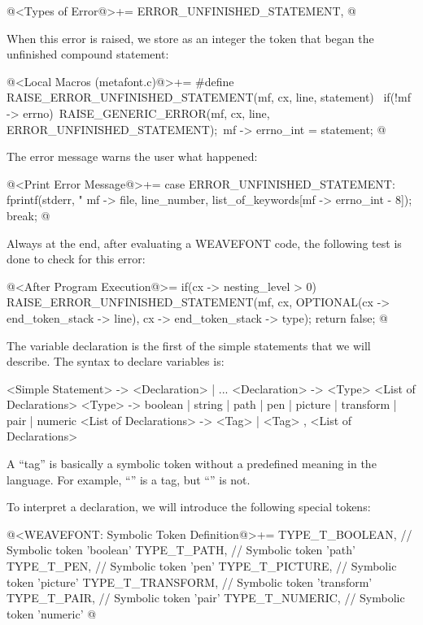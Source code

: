 \iniciocodigo
@<Types of Error@>+=
ERROR_UNFINISHED_STATEMENT,
@
\fimcodigo

When this error is raised, we store as an integer the token that began
the unfinished compound statement:

\iniciocodigo
@<Local Macros (metafont.c)@>+=
#define RAISE_ERROR_UNFINISHED_STATEMENT(mf, cx, line, statement) {\
  if(!mf -> errno){\
    RAISE_GENERIC_ERROR(mf, cx, line, ERROR_UNFINISHED_STATEMENT);\
    mf -> errno_int = statement;}}
@
\fimcodigo

The error message warns the user what happened:

\iniciocodigo
@<Print Error Message@>+=
case ERROR_UNFINISHED_STATEMENT:
  fprintf(stderr, "%
          mf -> file, line_number, list_of_keywords[mf -> errno_int - 8]);
  break;
@
\fimcodigo

Always at the end, after evaluating a WEAVEFONT code, the following
test is done to check for this error:

\iniciocodigo
@<After Program Execution@>=
if(cx -> nesting_level > 0){
  RAISE_ERROR_UNFINISHED_STATEMENT(mf, cx,
                                  OPTIONAL(cx -> end_token_stack -> line),
                                  cx -> end_token_stack -> type);
  return false;
}
@
\fimcodigo



The variable declaration is the first of the simple statements that we
will describe. The syntax to declare variables is:

\alinhaverbatim
<Simple Statement> -> <Declaration> | ...
<Declaration> -> <Type> <List of Declarations>
<Type> -> boolean | string | path | pen | picture | transform | pair |
          numeric
<List of Declarations> -> <Tag> | <Tag> , <List of Declarations>
\alinhanormal

A ``tag'' is basically a symbolic token without a predefined meaning
in the language. For example, ``'' is a tag, but
``'' is not.

To interpret a declaration, we will introduce the following special
tokens:

\iniciocodigo
@<WEAVEFONT: Symbolic Token Definition@>+=
TYPE_T_BOOLEAN,               // Symbolic token 'boolean'
TYPE_T_PATH,                  // Symbolic token 'path'
TYPE_T_PEN,                   // Symbolic token 'pen'
TYPE_T_PICTURE,               // Symbolic token 'picture'
TYPE_T_TRANSFORM,             // Symbolic token 'transform'
TYPE_T_PAIR,                  // Symbolic token 'pair'
TYPE_T_NUMERIC,               // Symbolic token 'numeric'
@
\fimcodigo

